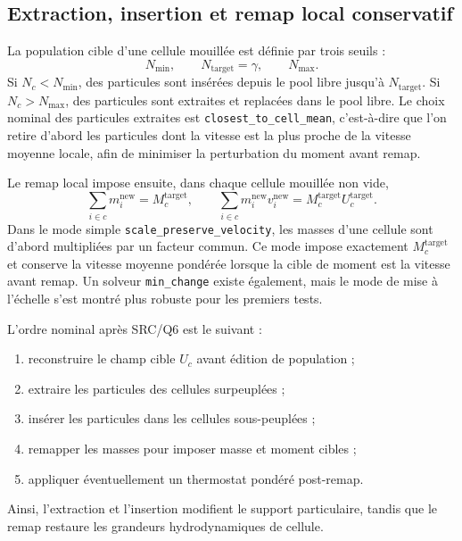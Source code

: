 \documentclass[11pt,a4paper]{article}
\begin{document}
\subsection{Extraction, insertion et remap local conservatif}

La population cible d'une cellule mouillée est définie par trois seuils :
\begin{equation}
  N_{\min},\qquad N_{\mathrm{target}}=\gamma,
  \qquad N_{\max}.
\end{equation}
Si $N_c<N_{\min}$, des particules sont insérées depuis le pool libre jusqu'à $N_{\mathrm{target}}$. Si $N_c>N_{\max}$, des particules sont extraites et replacées dans le pool libre. Le choix nominal des particules extraites est \texttt{closest\_to\_cell\_mean}, c'est-à-dire que l'on retire d'abord les particules dont la vitesse est la plus proche de la vitesse moyenne locale, afin de minimiser la perturbation du moment avant remap.

Le remap local impose ensuite, dans chaque cellule mouillée non vide,
\begin{equation}
  \sum_{i\in c} m_i^{\mathrm{new}} = M_c^{\mathrm{target}},
  \qquad
  \sum_{i\in c} m_i^{\mathrm{new}} v_i^{\mathrm{new}} = M_c^{\mathrm{target}} U_c^{\mathrm{target}}.
\end{equation}
Dans le mode simple \texttt{scale\_preserve\_velocity}, les masses d'une cellule sont d'abord multipliées par un facteur commun. Ce mode impose exactement $M_c^{\mathrm{target}}$ et conserve la vitesse moyenne pondérée lorsque la cible de moment est la vitesse avant remap. Un solveur \texttt{min\_change} existe également, mais le mode de mise à l'échelle s'est montré plus robuste pour les premiers tests.

L'ordre nominal après SRC/Q6 est le suivant :
\begin{enumerate}[label=\arabic*)]
  \item reconstruire le champ cible $U_c$ avant édition de population ;
  \item extraire les particules des cellules surpeuplées ;
  \item insérer les particules dans les cellules sous-peuplées ;
  \item remapper les masses pour imposer masse et moment cibles ;
  \item appliquer éventuellement un thermostat pondéré post-remap.
\end{enumerate}
Ainsi, l'extraction et l'insertion modifient le support particulaire, tandis que le remap restaure les grandeurs hydrodynamiques de cellule.
\end{document}
